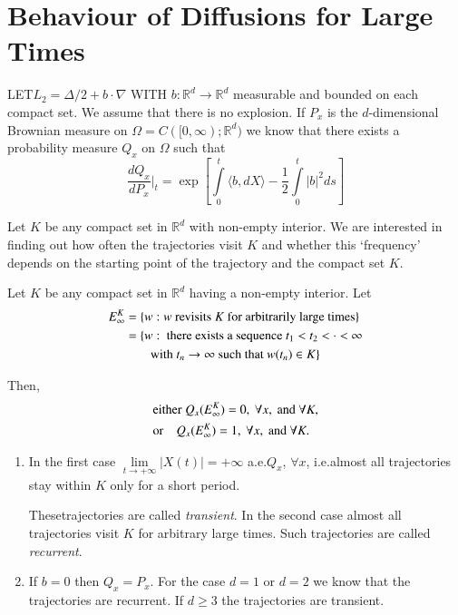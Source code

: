 \chapter{Behaviour of Diffusions for Large Times}\label{chap30}

LET\pageoriginale $L_{2}=\Delta/2+b\cdot\nabla$ WITH
$b:\mathbb{R}^{d}\to \mathbb{R}^{d}$ measurable and bounded on each
compact set. We assume that there is no explosion. If $P_{x}$ is the
$d$-dimensional Brownian measure on
$\Omega=C([0,\infty);\mathbb{R}^{d})$ we know that there exists a
  probability measure $Q_{x}$ on $\Omega$ such that 
$$
\dfrac{dQ_{x}}{dP_{x}}\Big|_{t}=\exp \left[\int\limits^{t}_{0}\langle
  b,dX\rangle -\frac{1}{2}\int\limits^{t}_{0}|b|^{2}ds\right]
$$

Let $K$ be any compact set in $\mathbb{R}^{d}$ with non-empty
interior. We are interested in finding out how often the trajectories
visit $K$ and whether this `frequency' depends on the starting point
of the trajectory and the compact set $K$.

\begin{theorem*}
Let $K$ be any compact set in $\mathbb{R}^{d}$ having a non-empty
interior. Let
\begin{align*}
E^{K}_{\infty} &= \{w:w\text{~ revisits $K$ for arbitrarily large
  times}\}\\
&= \{w:\text{~ there exists a sequence~ } t_{1}<t_{2}<\cdot <\infty\\
&\qquad \text{with~ } t_{n}\to \infty\text{~ such that~ } w(t_{n})\in K\} 
\end{align*}

Then,
\begin{align*}
& \text{either~ }Q_{x}(E^{K}_{\infty})=0,\ \forall x,\text{~ and~ }
  \forall K,\\
&\text{or}\quad Q_{x}(E^{K}_{\infty})=1,\ \forall x,\text{~ and~ }
  \forall K.
\end{align*}
\end{theorem*}

\begin{remark*}
\begin{enumerate}
\item In the first case $\lim\limits_{t\to +\infty}|X(t)|=+\infty$
  a.e.\@ $Q_{x}$, $\forall x$, i.e.\@ almost all trajectories stay
  within $K$ only for a short period.

These\pageoriginale trajectories are called {\em transient}. In the
second case almost all trajectories visit $K$ for arbitrary large
times. Such trajectories are called {\em recurrent}.

\item  If $b=0$ then $Q_{x}=P_{x}$. For the case $d=1$ or $d=2$ we
  know that the trajectories are recurrent. If $d\geq 3$ the
  trajectories are transient.
\end{enumerate}
\end{remark*}


